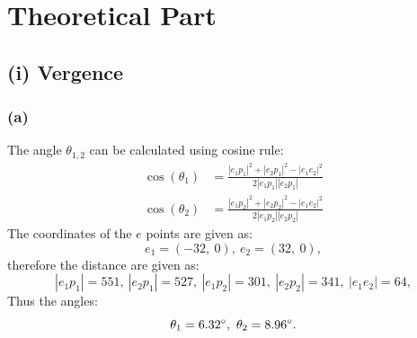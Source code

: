 \documentclass[11pt]{article}
\begin{document}
 


\section{Theoretical Part}
\subsection*{(i) Vergence}
\subsubsection*{(a)}
The angle $\theta_{1,2}$ can be calculated using cosine rule:
\begin{align}
    \cos(\theta_1) &= \frac{|e_1 p_1|^2 + |e_2 p_1|^2 - |e_1 e_2|^2}{2 |e_1 p_1| |e_2 p_1|}\\[3pt]
    \cos(\theta_2) &= \frac{|e_1 p_2|^2 + |e_2 p_2|^2 - |e_1 e_2|^2}{2 |e_1 p_2| |e_2 p_2|}
\end{align}
The coordinates of the $e$ points are given as: \[e_1 = (-32,\ 0),\ e_2=(32,\ 0), \] therefore the distance are given as: \[|e_1 p_1| = 551,\ |e_2 p_1|=527,\ |e_1 p_2|=301,\ |e_2 p_2|=341,\ |e_1 e_2|=64,\] 
Thus the angles: \[\theta_1=6.32\degree,\ \theta_2=8.96\degree.\]
\end{document}
